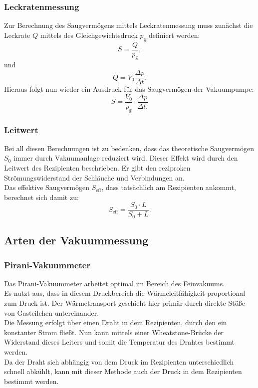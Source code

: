 		\subsubsection{Leckratenmessung}
			
			\noindent
			Zur Berechnung des Saugvermögens mittels Leckratenmessung muss zunächst die Leckrate $Q$ mittels des Gleichgewichtsdruck $p_\text{g}$ definiert werden:
			\begin{equation}
				S = \frac{Q}{p_\text{g}},
			\end{equation}
			und
			\begin{equation}
				Q = V_0 \frac{\Delta p}{\Delta t}.
			\end{equation}
			Hieraus folgt nun wieder ein Ausdruck für das Saugvermögen der Vakuumpumpe:
			\begin{equation}
				S = \frac{V_0}{p_\text{g}} \cdot \frac{\Delta p}{\Delta t.}
			\end{equation}
		\subsubsection{Leitwert}

			\noindent
			Bei all diesen Berechnungen ist zu bedenken, dass das theoretische Saugvermögen $S_0$ immer durch Vakuumanlage reduziert wird.
			Dieser Effekt wird durch den Leitwert des Rezipienten beschrieben. Er gibt den reziproken Strömungswiderstand der Schläuche und Verbindungen an.\\
			Das effektive Saugvermögen $S_\text{eff}$, dass tatsächlich am Rezipienten ankommt, berechnet sich damit zu:
			\begin{equation}
				S_\text{eff} = \frac{S_0 \cdot L}{S_0 + L}.
			\end{equation}

	\subsection{Arten der Vakuummessung}
		
		\subsubsection{Pirani-Vakuummeter}
			
			\noindent
			Das Pirani-Vakuummeter arbeitet optimal im Bereich des Feinvakuums.\\
			Es nutzt aus, dass in diesem Druckbereich die Wärmeleitfähigkeit proportional zum Druck ist. 
			Der Wärmetransport geschieht hier primär durch direkte Stöße von Gasteilchen untereinander. \\
			Die Messung erfolgt über einen Draht in dem Rezipienten, durch den ein konstanter Strom fließt.
			Nun kann mittels einer Wheatstone-Brücke der Widerstand dieses Leiters und somit die Temperatur des Drahtes bestimmt werden.\\
			Da der Draht sich abhängig von dem Druck im Rezipienten unterschiedlich schnell abkühlt, kann mit dieser Methode auch der Druck in dem Rezipienten bestimmt werden.

